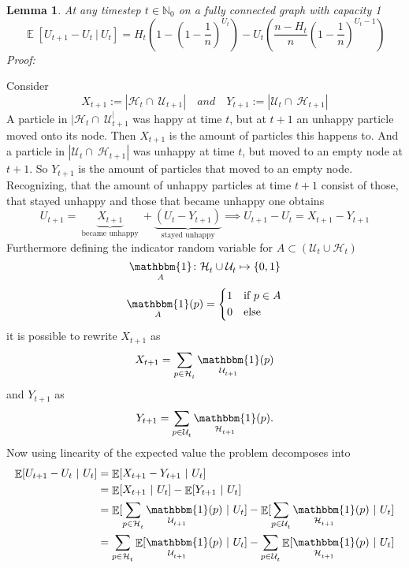\documentclass{article}
\newtheorem{lemma}[subsection]{Lemma}
\DeclareMathOperator{\EX}{\mathbb{E}}%
\newcommand{\Up}[2]{\mathcal{U}_{#1}^{#2}}
\newcommand{\Hp}[2]{\mathcal{H}_{#1}^{#2}}
\DeclareMathOperator{\Ind}{\mathbbm{1}}
\begin{document}
\begin{lemma}
  \label{cap1lem}
  At any timestep $t \in \mathbb{N}_0$ on a fully connected graph with capacity 1
  \begin{equation}
    \EX[U_{t+1} - U_t\ |\ U_t] = H_t \left( 1 - \left(1 - \frac{1}{n} \right)^{U_t} \right) - U_t \left( \frac{n - H_t}{n} \left(1 - \frac{1}{n} \right)^{U_t - 1} \right)
  \end{equation}
  Proof:
\end{lemma}
Consider 
\[ X_{t+1} := |\Hp{t}{} \cap \ \Up{t+1}{} | \quad and \quad Y_{t+1} := |\Up{t}{} \cap \ \Hp{t+1}{}|\]
A particle in $|\Hp{t}{} \cap \ \Up{t+1}|$ was happy at time $t$, but at $t+1$ an unhappy particle moved onto its node.
Then $X_{t+1}$ is the amount of particles this happens to.
And a particle in $|\Up{t}{} \cap \ \Hp{t+1}{}|$ was unhappy at time $t$, but moved to an empty node at $t + 1$.
So $Y_{t+1}{}$ is the amount of particles that moved to an empty node.
Recognizing, that the amount of unhappy particles at time $t+1$ consist of those, that stayed unhappy and those that became unhappy
one obtains
\[U_{t+1} = \underbrace{X_{t+1}}_{\text{ became unhappy }} + \underbrace{(U_t - Y_{t+1})}_{\text{stayed unhappy}} \implies U_{t+1} - U_t = X_{t+1} - Y_{t+1} \]
Furthermore defining the indicator random variable for  $A \subset (\Up{t}{} \cup \Hp{t}{})$
\[\Ind_{A} \colon \Hp{t}{} \cup \Up{t}{} \mapsto \{0,1\}\]
\[\Ind_{A}(p) = 
  \begin{cases*}
    1 \quad \text{if}\ p \in A \\
    0 \quad \text{else}
  \end{cases*}
\]
it is possible to rewrite $X_{t+1}$ as
\[X_{t+1} = \sum_{p \in \Hp{t}{}} \Ind_{\Up{t+1}{}}(p)\]
and $Y_{t+1}$ as
\[Y_{t+1} = \sum_{p \in \Up{t}{}} \Ind_{\Hp{t+1}{}}(p).\]
Now using linearity of the expected value the problem decomposes into
\begin{align*}
  \EX[U_{t+1} - U_t\ |\ U_t] &= \EX[X_{t+1} - Y_{t+1}\ |\ U_t] \\
                             &= \EX[X_{t+1}\ |\ U_t] - \EX[Y_{t+1}\ |\ U_t] \\
                             &= \EX[\sum_{p \in \Hp{t}{}} \Ind_{\Up{t+1}{}}(p)\ |\ U_t] - \EX[\sum_{p \in \Up{t}{}} \Ind_{\Hp{t+1}{}}(p)\ |\ U_t] \\
                             &= \sum_{p \in \Hp{t}{}} \EX[\Ind_{\Up{t+1}{}}(p)\ |\ U_t] - \sum_{p \in \Up{t}{}} \EX[\Ind_{\Hp{t+1}{}}(p)\ |\ U_t]
\end{align*}
  
\end{document}
